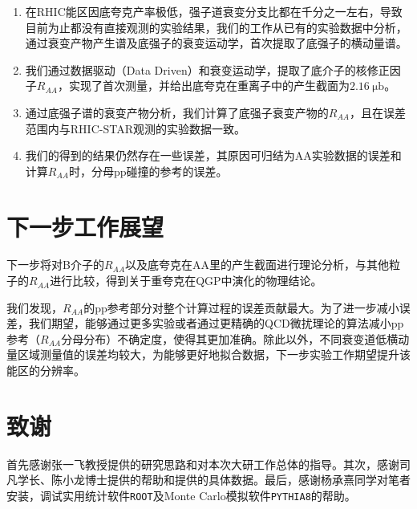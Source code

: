 \documentclass[12pt, a4paper]{ctexart}
\begin{document}
\begin{enumerate}

	

	\item 在RHIC能区因底夸克产率极低，强子道衰变分支比都在千分之一左右，导致目前为止都没有直接观测的实验结果，我们的工作从已有的实验数据中分析，通过衰变产物产生谱及底强子的衰变运动学，首次提取了底强子的横动量谱。
	\item 我们通过数据驱动（Data Driven）和衰变运动学，提取了底介子的核修正因子$R_{AA}$，实现了首次测量，并给出底夸克在重离子中的产生截面为$\SI{2.16}{\micro\barn}$。
    \item 通过底强子谱的衰变产物分析，我们计算了底强子衰变产物的$R_{AA}$，且在误差范围内与RHIC-STAR观测的实验数据一致。
    \item 我们的得到的结果仍然存在一些误差，其原因可归结为AA实验数据的误差和计算$R_{AA}$时，分母pp碰撞的参考的误差。
\end{enumerate}


\section{下一步工作展望} %
\label{sec:下一步工作展望}
下一步将对B介子的$R_{AA}$以及底夸克在AA里的产生截面进行理论分析，与其他粒子的$R_{AA}$进行比较，得到关于重夸克在QGP中演化的物理结论。

我们发现，$R_{AA}$的pp参考部分对整个计算过程的误差贡献最大\cite{Aidala:2019hib}。为了进一步减小误差，我们期望，能够通过更多实验或者通过更精确的QCD微扰理论的算法减小pp参考（$R_{AA}$分母分布）不确定度，使得其更加准确。除此以外，不同衰变道低横动量区域测量值的误差均较大，为能够更好地拟合数据，下一步实验工作期望提升该能区的分辨率。



\section{致谢} %
\label{sec:致谢}

首先感谢张一飞教授提供的研究思路和对本次大研工作总体的指导。其次，感谢司凡学长、陈小龙博士提供的帮助和提供的具体数据。最后，感谢杨承熹同学对笔者安装，调试实用统计软件\texttt{ROOT}及Monte Carlo模拟软件\texttt{PYTHIA8}\cite{Sj_strand_2015}的帮助。




\end{document}
